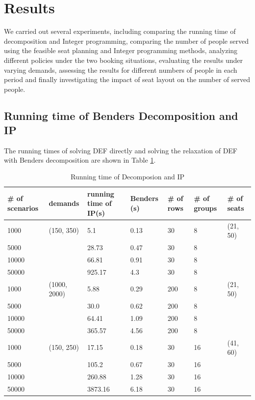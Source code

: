 \section{Results}
We carried out several experiments, including comparing the running time of decomposition and Integer programming, comparing the number of people served using the feasible seat planning and Integer programming methods, analyzing different policies under the two booking situations, evaluating the results under varying demands, assessing the results for different numbers of people in each period and finally investigating the impact of seat layout on the number of served people.

\subsection{Running time of Benders Decomposition and IP}\label{Bender_IP}

The running times of solving DEF directly and solving the relaxation of DEF with Benders decomposition are shown in Table \ref{tab_1}.

\begin{table}[ht]
  \centering
  \caption{Running time of Decomposion and IP}\label{tab_1}
  \begin{tabular}{|l|l|l|l|l|l|l|}
  \hline
  \# of scenarios & demands & running time of IP(s) & Benders (s) & \# of rows & \# of groups & \# of seats\\
  \hline
  1000  & (150, 350) & 5.1  & 0.13 & 30 & 8 & (21, 50)\\
  5000  & & 28.73 & 0.47 & 30 & 8 \\
  10000 & & 66.81  & 0.91 & 30 & 8 \\
  50000 & & 925.17 & 4.3 & 30 & 8 \\
  \hline
  1000  & (1000, 2000) & 5.88 & 0.29 & 200 & 8 & (21, 50)\\
  5000  & & 30.0 & 0.62 & 200 & 8 \\
  10000 & & 64.41 & 1.09 & 200 & 8 \\
  50000 & & 365.57 & 4.56 & 200 & 8 \\
  \hline
  1000  & (150, 250) & 17.15  & 0.18 & 30 & 16 & (41, 60) \\
  5000  & & 105.2  & 0.67 & 30 & 16  \\
  10000 & & 260.88 & 1.28 & 30 & 16  \\
  50000 & & 3873.16 & 6.18 & 30 & 16  \\
  \hline
  \end{tabular}
\end{table}

